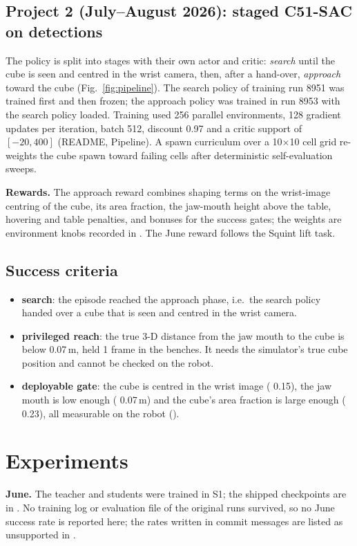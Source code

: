 \documentclass[conference,10pt]{IEEEtran}
\begin{document}
\subsection{Project 2 (July--August 2026): staged C51-SAC on detections}
The policy is split into stages with their own actor and critic: \emph{search} until the cube is seen and centred in
the wrist camera, then, after a hand-over, \emph{approach} toward the cube (Fig.~\ref{fig:pipeline}). The search policy of training run
8951 was trained first and then frozen; the approach policy was trained in run 8953 with the search policy loaded.
Training used 256 parallel environments, 128 gradient updates per iteration, batch 512, discount 0.97 and a critic support
of $[-20, 400]$ (README, Pipeline). A spawn curriculum over a 10$\times$10 cell grid re-weights the cube spawn toward
failing cells after deterministic self-evaluation sweeps.

\textbf{Rewards.} The approach reward combines shaping terms on the wrist-image centring of the cube, its area fraction,
the jaw-mouth height above the table, hovering and table penalties, and bonuses for the success gates; the weights are
environment knobs recorded in . The June reward follows the Squint
lift task.

\subsection{Success criteria}\label{sec:criteria}
\begin{itemize}
\item \textbf{search}: the episode reached the approach phase, i.e.\ the search policy handed over a cube that is seen and
  centred in the wrist camera.
\item \textbf{privileged reach}: the true 3-D distance from the jaw mouth to the cube is below 0.07\,m, held 1 frame in
  the benches. It needs the simulator's true cube position and cannot be checked on the robot.
\item \textbf{deployable gate}: the cube is centred in the wrist image ( 0.15), the jaw mouth is low
  enough ( 0.07\,m) and the cube's area fraction is large enough ( 0.23), all measurable
  on the robot ().
\end{itemize}

\section{Experiments}\label{sec:experiments}
\textbf{June.} The teacher and students were trained in S1; the shipped checkpoints are in
. No training log or evaluation file of the original runs survived, so no June success rate
is reported here; the rates written in commit messages are listed as unsupported in .
\end{document}
